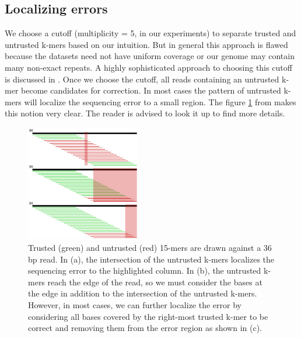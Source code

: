 \documentclass[11pt]{article}
\begin{document}
\subsection{Localizing errors}
We choose a cutoff (multiplicity = 5, in our experiments) to separate trusted and untrusted k-mers based on our intuition. But in general this approach is flawed because the datasets need not have uniform coverage or our genome  may contain many non-exact repeats. A highly sophisticated approach to choosing this cutoff is discussed in \cite{chikhi,quake}. Once we choose the cutoff, all reads containing an untrusted k-mer become candidates for correction. In most cases the pattern of untrusted k-mers will localize the sequencing error to a small region. The figure \ref{lc} from \cite{quake} makes this notion very clear. The reader is advised to look it up to find more details.
\begin{figure}[ht!]
\centering
\includegraphics[width=50mm]{overlaps.jpg}
\caption{\tiny{Trusted (green) and untrusted (red) 15-mers are drawn against a 36 bp read. In (a), the intersection of the untrusted k-mers localizes the sequencing error to the highlighted column. In (b), the untrusted k-mers reach the edge of the read, so we must consider the bases at the edge in addition to the intersection of the untrusted k-mers. However, in most cases, we can further localize the error by considering all bases covered by the right-most trusted k-mer to be correct and removing them from the error region as shown in (c). }}
\label{lc}
\end{figure} 
\end{document}
